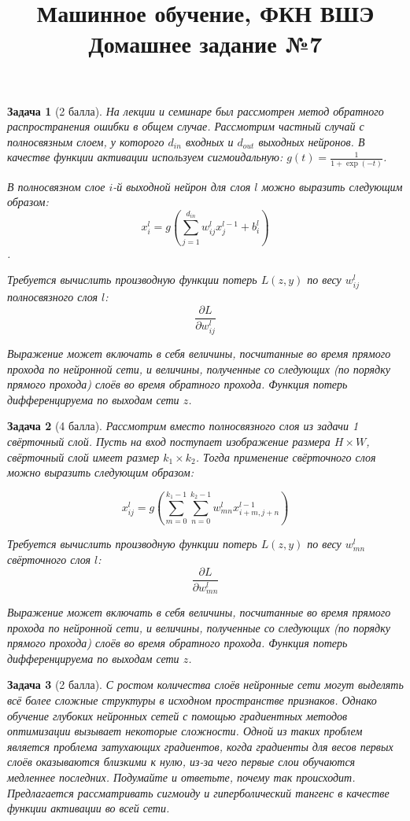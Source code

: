 \documentclass[12pt,fleqn]{article}
\title{Машинное обучение, ФКН ВШЭ\\Домашнее задание №7}
\author{}
\date{}
\newtheorem{esProblem}{Задача}
\begin{document}
    \maketitle
    
    \begin{esProblem}[2 балла]
        На лекции и семинаре был рассмотрен метод обратного распространения ошибки в общем случае. Рассмотрим частный случай с полносвязным слоем, у которого $d_{in}$ входных и $d_{out}$ выходных нейронов. В качестве функции активации используем сигмоидальную: $g(t) = \frac{1}{1+\exp(-t)}$. 

        В полносвязном слое $i$-й выходной нейрон для слоя $l$ можно выразить следующим образом: 
        $$x_i^l = g \left( \sum_{j=1}^{d_{in}} w_{ij}^{l} x_{j}^{l-1} + b_i^l \right)$$.

        Требуется вычислить производную функции потерь $L(z, y)$ по весу $w_{ij}^{l}$ полносвязного слоя $l$: 
        $$\frac{\partial L}{\partial w_{ij}^{l}}$$

        Выражение может включать в себя величины, посчитанные во время прямого прохода по нейронной сети, и величины, полученные со следующих (по порядку прямого прохода) слоёв во время обратного прохода. Функция потерь дифференцируема по выходам сети $z$.
    \end{esProblem}


    \begin{esProblem}[4 балла]
        Рассмотрим вместо полносвязного слоя из задачи 1 свёрточный слой. Пусть на вход поступает изображение размера $H \times W$, свёрточный слой имеет размер $k_1 \times k_2$. Тогда применение свёрточного слоя можно выразить следующим образом:

        $$x_{ij}^l = g \left( \sum_{m=0}^{k_1-1} \sum_{n=0}^{k_2-1} w_{mn}^{l} x_{i+m,j+n}^{l-1} \right)$$

        Требуется вычислить производную функции потерь $L(z, y)$ по весу $w_{mn}^{l}$ свёрточного слоя $l$: 
        $$\frac{\partial L}{\partial w_{mn}^{l}}$$

        Выражение может включать в себя величины, посчитанные во время прямого прохода по нейронной сети, и величины, полученные со следующих (по порядку прямого прохода) слоёв во время обратного прохода. Функция потерь дифференцируема по выходам сети $z$.
    \end{esProblem}
    

    \begin{esProblem}[2 балла]
        С ростом количества слоёв нейронные сети могут выделять всё более сложные структуры в исходном пространстве признаков. Однако обучение глубоких нейронных сетей с помощью градиентных методов оптимизации вызывает некоторые сложности. Одной из таких проблем является проблема затухающих градиентов, когда градиенты для весов первых слоёв оказываются близкими к нулю, из-за чего первые слои обучаются медленнее последних. Подумайте и ответьте, почему так происходит. Предлагается рассматривать сигмоиду и гиперболический тангенс в качестве функции активации во всей сети. 
    \end{esProblem}
\end{document}
